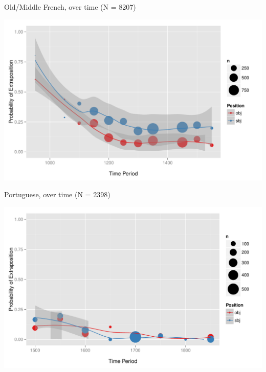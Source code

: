 \documentclass[hyperref={pdfpagelabels=false}]{beamer}
\begin{document}
\begin{frame}{Old/Middle French, over time (N = 8207)}

\begin{center}
\includegraphics[width=1.1\textwidth]{exSbjObjYearBinned50Loessfre.pdf}
\end{center}
\end{frame}




\begin{frame}{Portuguese, over time (N = 2398)}

\begin{center}
\includegraphics[width=1.1\textwidth]{exSbjObjYearBinned50Loessport.pdf}
\end{center}
\end{frame}
\end{document}
